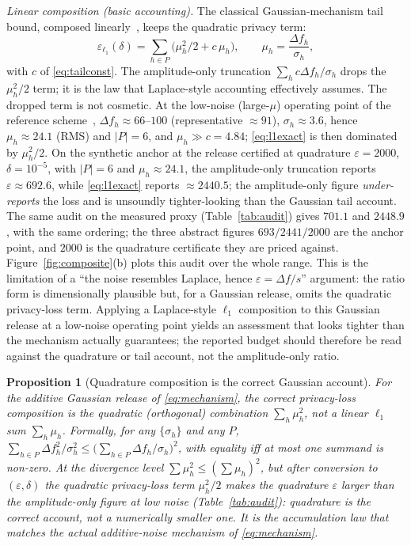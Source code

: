 \documentclass[10pt,twocolumn,letterpaper]{article}
\theoremstyle{plain}
\newtheorem{proposition}{Proposition}
\theoremstyle{definition}
\begin{document}
\emph{Linear composition (basic accounting).} The classical Gaussian-mechanism
tail bound, composed linearly~\cite{dwork2014}, keeps the quadratic privacy
term:
\begin{equation}
\varepsilon_{\ell_1}(\delta)=\sum_{h\in P}\Big(\mu_h^{2}/2+c\,\mu_h\Big),
\qquad \mu_h=\frac{\Delta f_h}{\sigma_h},
\label{eq:l1exact}
\end{equation}
with $c$ of \eqref{eq:tailconst}. The amplitude-only truncation
$\sum_hc\Delta f_h/\sigma_h$ drops the $\mu_h^{2}/2$ term; it is the law that
Laplace-style accounting effectively assumes. The dropped term is not cosmetic.
At the low-noise (large-$\mu$) operating point of the reference
scheme~\cite{arXiv2510},
$\Delta f_h\approx66$--$100$ (representative $\approx91$), $\sigma_h\approx3.6$, hence $\mu_h\approx24.1$ (RMS) and
$|P|=6$, and $\mu_h\gg c=4.84$;
\eqref{eq:l1exact} is then dominated by $\mu_h^2/2$. On the
synthetic anchor at the release certified at quadrature $\varepsilon=2000$,
$\delta=10^{-5}$, with $|P|=6$ and $\mu_h\approx24.1$, the amplitude-only
truncation reports $\varepsilon\approx692.6$, while
\eqref{eq:l1exact} reports $\approx2440.5$; the amplitude-only figure
\emph{under-reports} the loss and is unsoundly tighter-looking than the Gaussian
tail account. The same audit on
the measured proxy (Table~\ref{tab:audit}) gives $701.1$ and $2448.9$, with the
same ordering; the three abstract figures $693/2441/2000$ are the anchor point,
and $2000$ is the quadrature certificate they are priced against.
Figure~\ref{fig:composite}(b) plots this audit over the whole range. This is
the limitation of a ``the noise resembles Laplace, hence
$\varepsilon=\Delta f/s$'' argument: the ratio form is dimensionally plausible
but, for a Gaussian release, omits the quadratic privacy-loss term. Applying a
Laplace-style $\ell_1$ composition to this
Gaussian release at a low-noise operating point yields an assessment that looks
tighter than the mechanism actually guarantees; the reported budget should
therefore be read against the quadrature or tail account, not the amplitude-only
ratio.

\begin{proposition}[Quadrature composition is the correct Gaussian account]
\label{pr:quadrature}
For the additive Gaussian release of \eqref{eq:mechanism}, the correct
privacy-loss composition is the quadratic (orthogonal) combination
$\sum_h\mu_h^{2}$, not a linear $\ell_1$ sum $\sum_h\mu_h$. Formally, for any
$\{\sigma_h\}$ and any $P$,
$\sum_{h\in P}\Delta f_h^{2}/\sigma_h^{2}
\le\big(\sum_{h\in P}\Delta f_h/\sigma_h\big)^{2}$, with equality iff at most
one summand is non-zero. At the divergence level $\sum\mu_h^2\le(\sum\mu_h)^2$, but after conversion to
$(\varepsilon,\delta)$ the quadratic privacy-loss term $\mu_h^2/2$ makes the
quadrature $\varepsilon$ larger than the amplitude-only figure at low noise
(Table~\ref{tab:audit}): quadrature is the \emph{correct} account, not a
numerically smaller one. It is the accumulation law that matches the actual
additive-noise mechanism of \eqref{eq:mechanism}.
\end{proposition}
\end{document}
